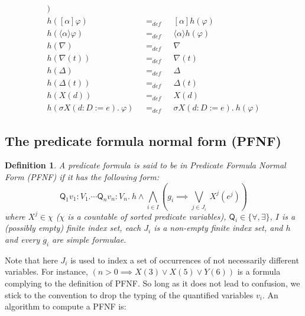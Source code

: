 \documentclass{article}
\newtheorem{definition}[theorem]{Definition}
\begin{document}
\begin{equation*}
\begin{array}{lll}
) \\
h([\alpha ]\varphi ) & =_{def} & [\alpha ]h(\varphi ) \\
h(\langle \alpha \rangle \varphi ) & =_{def} & \langle \alpha \rangle
h(\varphi ) \\
h(\nabla ) & =_{def} & \nabla \\
h(\nabla (t)) & =_{def} & \nabla (t) \\
h(\Delta ) & =_{def} & \Delta \\
h(\Delta (t)) & =_{def} & \Delta (t) \\
h(X(d)) & =_{def} & X(d) \\
h(\sigma X(d{:}D:=e).~\varphi )~~~ & =_{def}~~~ & \sigma X(d{:}%
D:=e).~h(\varphi )%
\end{array}%
\end{equation*}%
\pagebreak

\subsection{The predicate formula normal form (PFNF)}

\begin{definition}
A predicate formula is said to be in \emph{Predicate Formula Normal Form}
(PFNF) if it has the following form:
\begin{equation*}
\mathsf{Q}_{1}v_{1}{:}V_{1}.\cdots \mathsf{Q}_{n}v_{n}{:}V_{n}.~h\wedge
\bigwedge\limits_{i\in I}\left( g_{i}\implies \bigvee\limits_{j\in
J_{i}}~X^{j}(e^{j})\right)
\end{equation*}%
where $X^{j}\in \chi $ ($\chi $ is a countable of sorted predicate
variables), $\mathsf{Q}_{i}\in \{\forall ,\exists \}$, $I$ is a (possibly
empty) finite index set, each $J_{i}$ is a non-empty finite index set, and $%
h $ and every $g_{i}$ are simple formulae.
\end{definition}

Note that here $J_{i}$ is used to index a set of occurrences of not
necessarily different variables. For instance, $(n>0\implies X(3)\vee
X(5)\vee Y(6))$ is a formula complying to the definition of PFNF. So long as
it does not lead to confusion, we stick to the convention to drop the typing
of the quantified variables $v_{i}$. An algorithm to compute a PFNF is:
\end{document}
